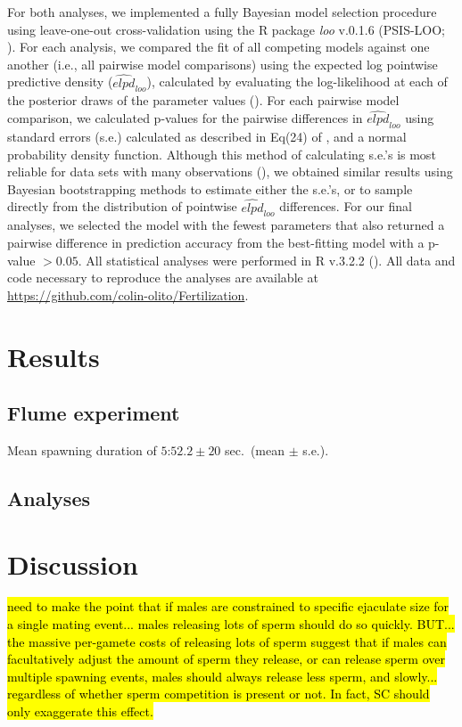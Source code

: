 \documentclass{article}
\begin{document}
	For both analyses, we implemented a fully Bayesian model selection procedure using leave-one-out cross-validation using the R package \textit{loo} v.0.1.6 (PSIS-LOO; \citealt{Vehtari2016}). For each analysis, we compared the fit of all competing models against one another (i.e., all pairwise model comparisons) using the expected log pointwise predictive density ($\widehat{\textit{elpd}}_{\textit{loo}}$), calculated by evaluating the log-likelihood at each of the posterior draws of the parameter values (\citealt{HootenHobbs2015,Vehtari2016}). For each pairwise model comparison, we calculated p-values for the pairwise differences in $\widehat{\textit{elpd}}_{\textit{loo}}$ using standard errors (s.e.) calculated as described in Eq(24) of \citet{Vehtari2016}, and a normal probability density function. Although this method of calculating s.e.'s is most reliable for data sets with many observations (\citealt{Vehtari2016}), we obtained similar results using Bayesian bootstrapping methods to estimate either the s.e.'s, or to sample directly from the distribution of pointwise $\widehat{\textit{elpd}}_{\textit{loo}}$ differences. For our final analyses, we selected the model with the fewest parameters that also returned a pairwise difference in prediction accuracy from the best-fitting model with a p-value $> 0.05$. All statistical analyses were performed in R v.3.2.2 (\citealt{R2016}). All data and code necessary to reproduce the analyses are available at \url{https://github.com/colin-olito/Fertilization}.

\section*{Results}

	\subsection*{Flume experiment}

	Mean spawning duration of $5$:$52.2 \pm 20$ sec.~(mean $\pm$ s.e.).

	\subsection*{Analyses}


\section*{Discussion}

\hl{need to make the point that if males are constrained to specific ejaculate size for a single mating event... males releasing lots of sperm should do so quickly.  BUT... the massive per-gamete costs of releasing lots of sperm suggest that if males can facultatively adjust the amount of sperm they release, or can release sperm over multiple spawning events, males should always release less sperm, and slowly... regardless of whether sperm competition is present or not. In fact, SC should only exaggerate this effect.}
\end{document}
